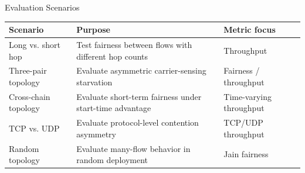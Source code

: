 \begin{frame}{Evaluation Scenarios}

\begin{center}
\begin{tabular}{p{} p{} p{}}
\toprule
\textbf{Scenario} & \textbf{Purpose} & \textbf{Metric focus} \\
\midrule
Long vs. short hop & Test fairness between flows with different hop counts & Throughput \\
Three-pair topology & Evaluate asymmetric carrier-sensing starvation & Fairness / throughput \\
Cross-chain topology & Evaluate short-term fairness under start-time advantage & Time-varying throughput \\
TCP vs. UDP & Evaluate protocol-level contention asymmetry & TCP/UDP throughput \\
Random topology & Evaluate many-flow behavior in random deployment & Jain fairness \\
\bottomrule
\end{tabular}
\end{center}
\end{frame}
